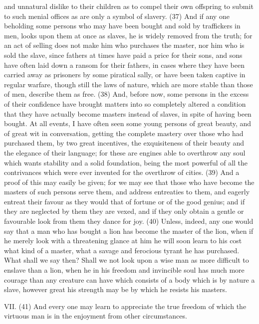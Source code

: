 and unnatural dislike to their children as to compel their own offspring to submit to such menial
offices as are only a symbol of slavery. (37) And if any one beholding some persons who may
have been bought and sold by traffickers in men, looks upon them at once as slaves, he is widely
removed from the truth; for an act of selling does not make him who purchases the master, nor him
who is sold the slave, since fathers at times have paid a price for their sons, and sons have often
laid down a ransom for their fathers, in cases where they have been carried away as prisoners by
some piratical sally, or have been taken captive in regular warfare, though still the laws of nature,
which are more stable than those of men, describe them as free. (38) And, before now, some
persons in the excess of their confidence have brought matters into so completely altered a
condition that they have actually become masters instead of slaves, in spite of having been bought.
At all events, I have often seen some young persons of great beauty, and of great wit in
conversation, getting the complete mastery over those who had purchased them, by two great
incentives, the exquisiteness of their beauty and the elegance of their language; for these are
engines able to overthrow any soul which wants stability and a solid foundation, being the most
powerful of all the contrivances which were ever invented for the overthrow of cities. (39) And a
proof of this may easily be given; for we may see that those who have become the masters of
such persons serve them, and address entreaties to them, and eagerly entreat their favour as they
would that of fortune or of the good genius; and if they are neglected by them they are vexed, and if
they only obtain a gentle or favourable look from them they dance for joy. (40) Unless, indeed, any
one would say that a man who has bought a lion has become the master of the lion, when if he
merely look with a threatening glance at him he will soon learn to his cost what kind of a master,
what a savage and ferocious tyrant he has purchased. What shall we say then? Shall we not look
upon a wise man as more difficult to enslave than a lion, when he in his freedom and invincible soul
has much more courage than any creature can have which consists of a body which is by nature a
slave, however great his strength may be by which he resists his masters.

VII. (41) And every one may learn to appreciate the true freedom of which the virtuous man is in
the enjoyment from other circumstances.

